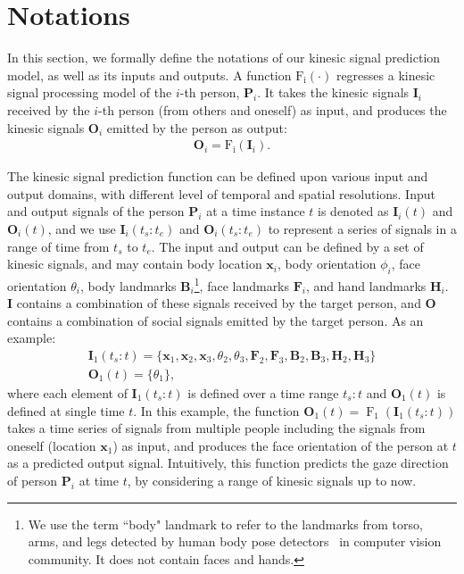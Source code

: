 \section{Notations}

In this section, we formally define the notations of our kinesic signal prediction model, as well as its inputs and outputs. A function $\operatorname{F_i}(\cdot)$  regresses a kinesic signal processing model of the $i$-th person, $\mathbf{P}_i$. It takes the kinesic signals $\mathbf{I}_i$ received by the $i$-th person (from others and oneself) as input, and produces the kinesic signals $\mathbf{O}_i$ emitted by the person as output:
\begin{align}
\mathbf{O}_i=\operatorname{F_i}\left( \mathbf{I}_i \right).
\end{align}

The kinesic signal prediction function can be defined upon various input and output domains, with different level of temporal and spatial resolutions. Input and output signals of the person $\mathbf{P}_i$ at a time instance $t$ is denoted as $\mathbf{I}_i (t)$ and $\mathbf{O}_i (t)$, and we use $\mathbf{I}_i (t_s:t_e)$ and $\mathbf{O}_i (t_s:t_e)$ to represent a series of signals in a range of time from $t_s$ to $t_e$. The input and output can be defined by a set of kinesic signals, and may contain body location $\mathbf{x}_i$, body orientation $\phi_i$, face orientation $\theta_i$, body landmarks $\mathbf{B}_i$\footnote{We use the term ``body" landmark to refer to the landmarks from torso, arms, and legs detected by human body pose detectors~\cite{Belagiannis2014, wei2016convolutional} in computer vision community. It does not contain faces and hands.}, face landmarks $\mathbf{F}_i$, and  hand landmarks $\mathbf{H}_i$. $\mathbf{I}$ contains a combination of these signals received by the target person, and $\mathbf{O}$ contains a combination of social signals emitted by the target person. As an example:
\begin{gather}
\mathbf{I}_1 ( t_s:t) =  \{  \mathbf{x}_1,  \mathbf{x}_2, \mathbf{x}_3,   \theta_2, \theta_3,   \mathbf{F}_2, \mathbf{F}_3,   \mathbf{B}_2, \mathbf{B}_3,   \mathbf{H}_2, \mathbf{H}_3  \}\\
\mathbf{O}_1 (t) =   \{    \theta_1 \}, 
\end{gather}
where each element of $\mathbf{I}_1 ( t_s:t) $ is defined over a time range $t_s:t$ and $\mathbf{O}_1 (t) $  is defined at single time $t$. In this example, the function $\mathbf{O}_1(t) = \operatorname{F}_1 \left( \mathbf{I}_1  ( t_s:t) \right)$ takes a time series of signals from multiple people including the signals from oneself (location $\mathbf{x}_1$) as input, and produces the face orientation of the person at $t$ as a predicted output signal. Intuitively, this function predicts the gaze direction of person $\mathbf{P}_{i}$ at time $t$, by considering a range of kinesic signals up to now. 

